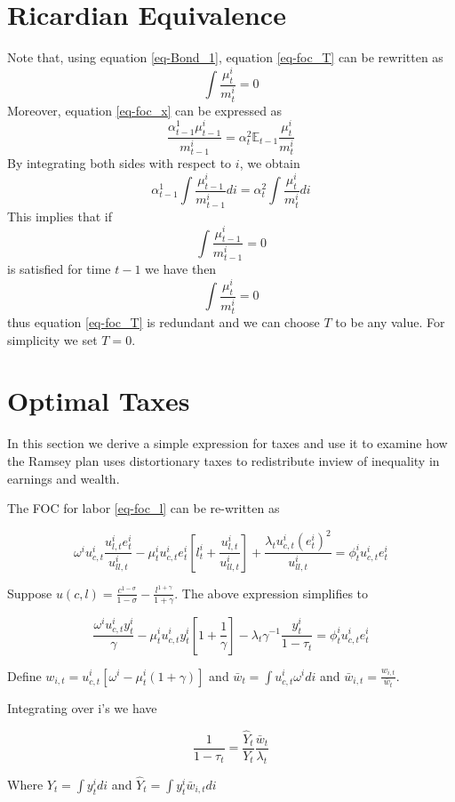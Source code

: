 \documentclass[thmsb,11pt]{article}
\newcommand{\EE}{\mathbb E}
\begin{document}
\section{Ricardian Equivalence}
Note that, using equation \eqref{eq-Bond_1}, equation \eqref{eq-foc_T} can be rewritten as 
\[
	\int \frac{\mu^i_t}{m^i_t} = 0
\]  Moreover, equation \eqref{eq-foc_x} can be expressed as
\[
\frac{\alpha^1_{t-1} \mu^i_{t-1}}{m^i_{t-1}} = \alpha^2_t \EE_{t-1} \frac{\mu^i_t}{m^i_t}
\]By integrating both sides with respect to $i$, we obtain
\[
	\alpha^1_{t-1} \int \frac{\mu^i_{t-1}}{m^i_{t-1}}di = \alpha^2_t\int \frac{\mu^i_{t}}{m^i_t} di
\]  This implies that if 
\[
	\int \frac{\mu^i_{t-1}}{m^i_{t-1}} = 0
\]is satisfied for time $t-1$ we have then
\[
	\int \frac{\mu^i_t}{m^i_t} = 0
\] thus equation \eqref{eq-foc_T} is redundant and we can choose $T$ to be any value.  For simplicity we set $T=0$.

\section{Optimal Taxes}
In this section we derive a simple expression for taxes and use it to examine how the Ramsey plan uses distortionary taxes to redistribute inview of inequality in earnings and wealth.  

The FOC for labor \eqref{eq-foc_l} can be re-written as 


 \[
\omega^i u^i_{c,t}\frac{u^i_{l,t} e^i_t}{u^i_{ll,t}}- \mu^i_t u^i_{c,t}e^i_t[l^i_t +\frac{u^i_{l,t}}{u^i_{ll,t}}]+\frac{\lambda_t u^i_{c,t}(e^i_t)^2}{u^i_{ll,t}}=\phi^i_tu^i_{c,t}e^i_t    	
\]

 Suppose $u(c,l)=\frac{c^{1-\sigma}}{1-\sigma}-\frac{l^{1+\gamma}}{1+\gamma}$. The above expression simplifies to


 \[
\frac{ \omega^i u^i_{c,t}y^i_t}{\gamma}- \mu^i_t u^i_{c,t}y^i_t[1 +\frac{1}{\gamma}]-\lambda_t\gamma^{- 1}\frac{y^i_t }{1-\tau_t}=\phi^i_tu^i_{c,t}e^i_t    	
 \]

Define $w_{i,t}=u^i_{c,t}[\omega^i-\mu^i_t(1+\gamma)]$ and $\bar{w}_{t} = \int u^i_{c,t}\omega^i di$ and $\bar{w}_{i,t}=\frac{w_{i,t}}{\bar{w}_t}$.

Integrating  over i's we have

 
\begin{equation}
	\label{eq-labor_taxes}
\frac{1}{1-\tau_t}=\frac{\hat{Y}_t}{Y_t} \frac{\bar{w}_t }{\lambda_t}
\end{equation}   

Where $Y_t=\int y^i_t di$ and $\hat{Y}_t=\int y^i_t \bar{w}_{i,t}di$
\end{document}
